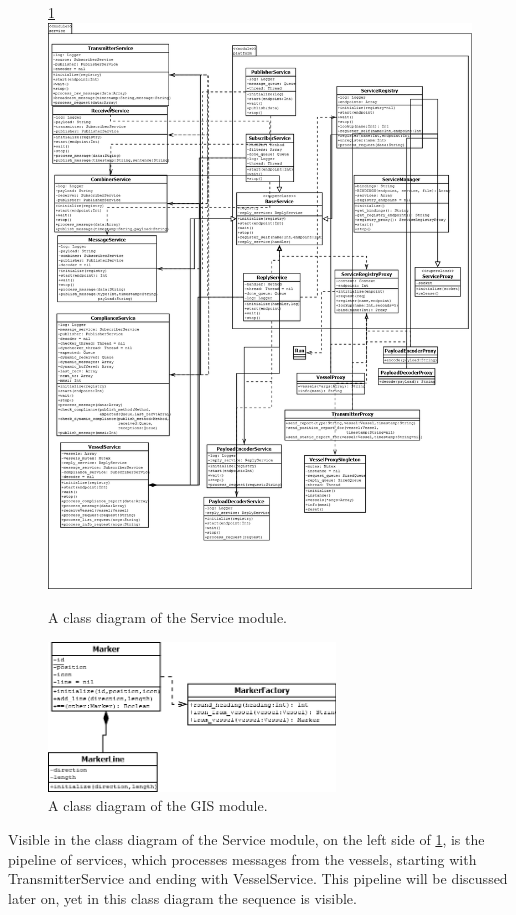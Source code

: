 \documentclass[12pt]{article}
\begin{document}
\begin{figure}
  \ref{lib_service_total}
  \centering
  \includegraphics[width=5in]{lib_service_total}
  \caption{A class diagram of the Service module.}
  \label{lib_service_total}
\end{figure}

\begin{figure}
  \centering
  \includegraphics[width=3in]{lib_gis_total}
  \caption{A class diagram of the GIS module.}
  \label{lib_gis_total}
\end{figure}

Visible in the class diagram of the Service module, on the left side of \ref{lib_service_total}, is the pipeline of services, which processes messages from the vessels, starting with TransmitterService and ending with VesselService. This pipeline will be discussed later on, yet in this class diagram the sequence is visible.
\end{document}
